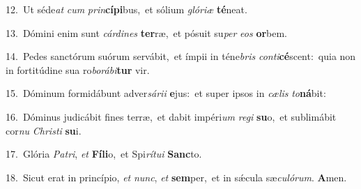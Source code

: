 {\numbfont\textcolor{\numbcolor}{12.}}~Ut séde\textit{at} \textit{cum} \textit{prin}\-\textbf{cí}\textbf{pi}bus,~\star et sólium \textit{gló}\-\textit{ri}\textit{æ} \textbf{té}\-neat.\par
{\numbfont\textcolor{\numbcolor}{13.}}~Dómini enim sunt \textit{cár}\-\textit{di}\textit{nes} \textbf{ter}\-ræ,~\star et pósuit su\textit{per} \textit{e}\-\textit{os} \textbf{or}\-bem.\par
{\numbfont\textcolor{\numbcolor}{14.}}~Pedes sanctórum suórum servábit,~\dagger et ímpii in téne\textit{bris} \textit{con}\-\textit{ti}\textbf{cé}scent:~\star quia non in fortitúdine sua ro\-\textit{bo}\-\textit{rá}\textit{bi}\textbf{tur} vir.\par
{\numbfont\textcolor{\numbcolor}{15.}}~Dóminum formidábunt adver\-\textit{sá}\-\textit{ri}\textit{i} \textbf{e}\-jus:~\star et super ipsos in \textit{cæ}\-\textit{lis} \textit{to}\-\textbf{ná}bit:\par
{\numbfont\textcolor{\numbcolor}{16.}}~Dóminus judicábit fines terræ,~\dagger et dabit impéri\textit{um} \textit{re}\-\textit{gi} \textbf{su}\-o,~\star et sublimábit cor\textit{nu} \textit{Chris}\-\textit{ti} \textbf{su}\-i.\par
{\numbfont\textcolor{\numbcolor}{17.}}~Glória \textit{Pa}\-\textit{tri}, \textit{et} \textbf{Fí}\-\textbf{li}o,~\star et Spi\-\textit{rí}\-\textit{tu}\textit{i} \textbf{Sanc}\-to.\par
{\numbfont\textcolor{\numbcolor}{18.}}~Sicut erat in princípio, \textit{et} \textit{nunc}\-, \textit{et} \textbf{sem}\-per,~\star et in sǽcula sæ\-\textit{cu}\-\textit{ló}\textit{rum}. \textbf{A}\-men.\par
